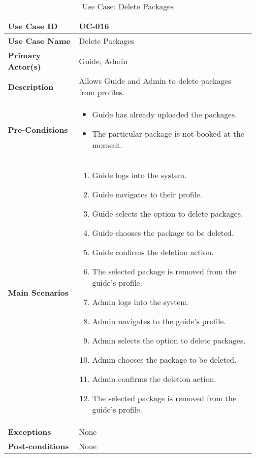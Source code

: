 \begin{table}[ht]
    \centering
    \begin{tabular}{|l|p{}|}
        \hline
        \textbf{Use Case ID} & UC-016 \\
        \hline
        \textbf{Use Case Name} & Delete Packages \\
        \hline
        \textbf{Primary Actor(s)} & Guide, Admin \\
        \hline
        \textbf{Description} & Allows Guide and Admin to delete packages from profiles. \\
        \hline
        \textbf{Pre-Conditions} & 
        \begin{itemize}[itemsep=0pt]
            \item Guide has already uploaded the packages.
            \item The particular package is not booked at the moment.
        \end{itemize} \\
        \hline
        \textbf{Main Scenarios} & 
        \begin{enumerate}[label=\arabic*.,itemsep=0pt]
            \item Guide logs into the system.
            \item Guide navigates to their profile.
            \item Guide selects the option to delete packages.
            \item Guide chooses the package to be deleted.
            \item Guide confirms the deletion action.
            \item The selected package is removed from the guide's profile.
            \item Admin logs into the system.
            \item Admin navigates to the guide's profile.
            \item Admin selects the option to delete packages.
            \item Admin chooses the package to be deleted.
            \item Admin confirms the deletion action.
            \item The selected package is removed from the guide's profile.
        \end{enumerate} \\
        \hline
        \textbf{Exceptions} & None \\
        \hline
        \textbf{Post-conditions} & None \\
        \hline
    \end{tabular}
    \label{tab:use-case-delete-packages}
    \caption{Use Case: Delete Packages}
\end{table}


